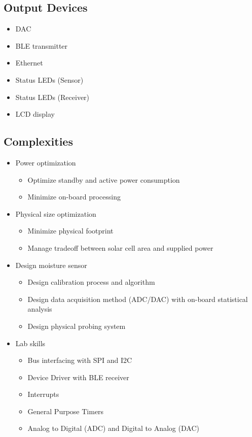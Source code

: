 \documentclass{article}
\begin{document}
\subsection{Output Devices}
\begin{itemize}
	\item DAC
    \item BLE transmitter
	\item Ethernet
	\item Status LEDs (Sensor)
	\item Status LEDs (Receiver)
	\item LCD display
\end{itemize}

\subsection{Complexities}
\begin{itemize}
    \item Power optimization
        \begin{itemize}
            \item Optimize standby and active power consumption
            \item Minimize on-board processing
        \end{itemize}
    \item Physical size optimization
        \begin{itemize}
            \item Minimize physical footprint
            \item Manage tradeoff between solar cell area and supplied power
        \end{itemize}
    \item Design moisture sensor
        \begin{itemize}
            \item Design calibration process and algorithm
            \item Design data acquisition method (ADC/DAC) with on-board
                statistical analysis
            \item Design physical probing system
        \end{itemize}
    \item Lab skills
        \begin{itemize}
            \item Bus interfacing with SPI and I2C
            \item Device Driver with BLE receiver
            \item Interrupts
            \item General Purpose Timers
            \item Analog to Digital (ADC) and Digital to Analog (DAC)
        \end{itemize}
\end{itemize}
\end{document}
